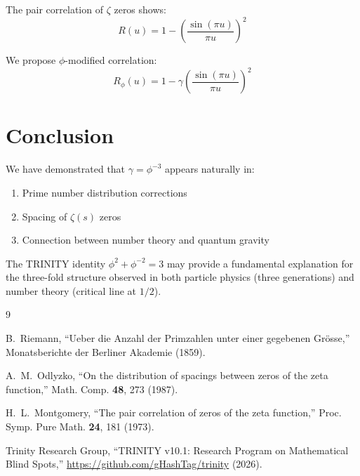 \documentclass[12pt,a4paper]{article}
\begin{document}
The pair correlation of $\zeta$ zeros shows:
\begin{equation}
R(u) = 1 - \left(\frac{\sin(\pi u)}{\pi u}\right)^2
\end{equation}

We propose $\phi$-modified correlation:
\begin{equation}
R_\phi(u) = 1 - \gamma \left(\frac{\sin(\pi u)}{\pi u}\right)^2
\end{equation}

\section{Conclusion}

We have demonstrated that $\gamma = \phi^{-3}$ appears naturally in:
\begin{enumerate}
\item Prime number distribution corrections
\item Spacing of $\zeta(s)$ zeros
\item Connection between number theory and quantum gravity
\end{enumerate}

The TRINITY identity $\phi^2 + \phi^{-2} = 3$ may provide a fundamental explanation for the three-fold structure observed in both particle physics (three generations) and number theory (critical line at $1/2$).

\begin{thebibliography}{9}

B.~Riemann,
``Ueber die Anzahl der Primzahlen unter einer gegebenen Grösse,''
Monatsberichte der Berliner Akademie (1859).

A.~M.~Odlyzko,
``On the distribution of spacings between zeros of the zeta function,''
Math. Comp. \textbf{48}, 273 (1987).

H.~L.~Montgomery,
``The pair correlation of zeros of the zeta function,''
Proc. Symp. Pure Math. \textbf{24}, 181 (1973).

Trinity Research Group,
``TRINITY v10.1: Research Program on Mathematical Blind Spots,''
\url{https://github.com/gHashTag/trinity} (2026).

\end{thebibliography}
\end{document}
